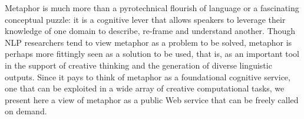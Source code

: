 Metaphor is much more than a pyrotechnical flourish of language or a fascinating conceptual puzzle: it is a cognitive lever that allows speakers to leverage their knowledge of one domain to describe, re-frame and understand another. Though NLP researchers tend to view metaphor as a problem to be solved, metaphor is perhaps more fittingly seen as a solution to be used, that is, as an important tool in the support of creative thinking and the generation of diverse linguistic outputs. Since it pays to think of metaphor as a foundational cognitive service, one that can be exploited in a wide array of creative computational tasks, we present here a view of metaphor as a public Web service that can be freely called on demand.
